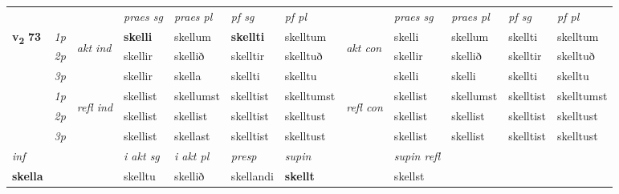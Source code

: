 \begin{longtable}[l]{X>{\footnotesize\itshape}llXXXXlXXXX}
 & &   & \textit{praes sg}  & \textit{praes pl}    & \textit{ pf sg} & \textit{pf pl} & & \textit{praes sg}  & \textit{praes pl}    & \textit{pf sg} & \textit{pf pl }  \\ \cmidrule{4-7} \cmidrule{9-12}
 \multirow{2}{*}{{{\textbf{v{\textsubscript{2}}} \Large{\textbf{73}}}}}  & 1p & \multirow{3}{*}{\begin{turn}{90}\textit{akt ind}\end{turn}} & \textbf{skelli} & skellum & \textbf{skellti} & skelltum & \multirow{3}{*}{\begin{turn}{90}\textit{akt con}\end{turn}} &skelli & skellum & skellti & skelltum\\*
 & 2p &  &  skellir  & skellið & skelltir & skelltuð & & skellir & skellið & skelltir & skelltuð \\*
 & 3p &  & skellir & skella & skellti & skelltu & & skelli & skelli& skellti & skelltu \\*
\cmidrule{4-7} \cmidrule{9-12}
 & 1p & \multirow{3}{*}{\begin{turn}{90}\textit{refl ind}\end{turn}}  & skellist & skellumst & skelltist & skelltumst & \multirow{3}{*}{\begin{turn}{90}\textit{refl con}\end{turn}}  &skellist & skellumst & skelltist & skelltumst \\*
 & 2p &  & skellist & skellist & skelltist & skelltust & &skellist & skellist & skelltist & skelltust \\*
 & 3p  & & skellist & skellast & skelltist & skelltust & & skellist & skellist& skelltist & skelltust \\*
\cmidrule{4-7} \cmidrule{9-12}

   {\textit{inf}} & &  & \textit{i akt sg} & \textit{i akt pl}   & \textit{presp} & \textit{supin} && \textit{supin refl}  \\*
  {\textbf{skella}} & && skelltu  & skellið   & skellandi &  \textbf{skellt} && skellst  \\*

\midrule


\end{longtable}
